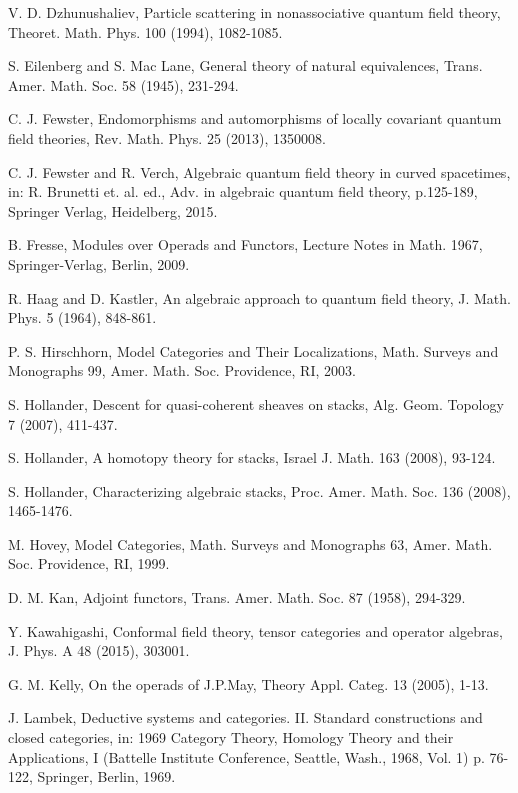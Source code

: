 \documentclass{amsbook}
\numberwithin{section}{chapter}
\numberwithin{subsection}{section}
\numberwithin{equation}{section}
\theoremstyle{plain}
\theoremstyle{definition}
\begin{document}
\begin{thebibliography}{AAAAAA}
V. D. Dzhunushaliev, Particle scattering in nonassociative quantum field theory, Theoret. Math. Phys. 100 (1994), 1082-1085.

S. Eilenberg and S. Mac Lane, General theory of natural equivalences, Trans. Amer. Math. Soc. 58 (1945), 231-294.

C. J. Fewster, Endomorphisms and automorphisms of locally covariant quantum field theories, Rev. Math. Phys. 25 (2013), 1350008.

C. J. Fewster and R. Verch, Algebraic quantum field theory in curved spacetimes, in: R. Brunetti et. al. ed., Adv. in algebraic quantum field theory, p.125-189, Springer Verlag, Heidelberg, 2015.

B. Fresse, Modules over Operads and Functors, Lecture Notes in Math. 1967, Springer-Verlag, Berlin, 2009.

R. Haag and D. Kastler, An algebraic approach to quantum field theory, J. Math. Phys. 5 (1964), 848-861.
 
P. S. Hirschhorn, Model Categories and Their Localizations, Math. Surveys and Monographs 99, Amer. Math. Soc. Providence, RI, 2003.

S. Hollander, Descent for quasi-coherent sheaves on stacks, Alg. Geom. Topology 7 (2007), 411-437.

S. Hollander, A homotopy theory for stacks, Israel J. Math. 163 (2008), 93-124.

S. Hollander, Characterizing algebraic stacks, Proc. Amer. Math. Soc. 136 (2008), 1465-1476.

M. Hovey, Model Categories, Math. Surveys and Monographs 63, Amer. Math. Soc. Providence, RI, 1999.

D. M. Kan, Adjoint functors, Trans. Amer. Math. Soc. 87 (1958), 294-329.

Y. Kawahigashi, Conformal field theory, tensor categories and operator algebras, J. Phys. A 48 (2015), 303001.

G. M. Kelly, On the operads of J.P.May, Theory Appl. Categ. 13 (2005), 1-13.

J. Lambek, Deductive systems and categories. II. Standard constructions and
closed categories, in: 1969 Category Theory, Homology Theory and their
Applications, I (Battelle Institute Conference, Seattle, Wash., 1968, Vol. 1)
p. 76-122, Springer, Berlin, 1969.


\end{thebibliography}
\end{document}
